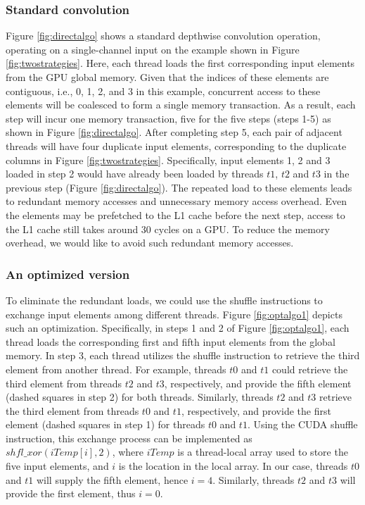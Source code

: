 \subsubsection{Standard convolution} Figure \ref{fig:directalgo} shows a standard depthwise convolution operation, operating on a single-channel input on the example shown in Figure \ref{fig:twostrategies}.
Here, each thread loads the first corresponding input elements from the GPU global memory.
Given that the indices of these elements are contiguous, i.e., 0, 1, 2, and 3 in this example, concurrent access to these elements will be coalesced to form a single memory transaction.
As a result, each step will incur one memory transaction, five for the five steps (steps 1-5) as shown in Figure \ref{fig:directalgo}.
After completing step 5, each pair of adjacent threads will have four duplicate input elements, corresponding to the duplicate columns in Figure \ref{fig:twostrategies}.
Specifically, input elements 1, 2 and 3 loaded in step 2 would have already been loaded by threads $t1$, $t2$ and $t3$ in the previous step (Figure \ref{fig:directalgo}).
The repeated load to these elements leads to redundant memory accesses and unnecessary memory access overhead.
Even the elements may be prefetched to the L1 cache before the next step, access to the L1 cache still takes around 30 cycles on a GPU.
To reduce the memory overhead, we would like to avoid such redundant memory accesses.

\subsubsection{An optimized version} To eliminate the redundant loads, we could use the shuffle instructions to exchange input elements among
different threads.
Figure \ref{fig:optalgo1} depicts such an optimization.
Specifically, in steps 1 and 2 of Figure \ref{fig:optalgo1}, each thread loads the corresponding first and fifth input elements from the global memory.
In step 3, each thread utilizes the shuffle instruction to retrieve the third element from another thread.
For example, threads $t0$ and $t1$ could retrieve the third element from threads $t2$ and $t3$, respectively, and provide the fifth element (dashed squares in step 2) for both threads.
Similarly, threads $t2$ and $t3$ retrieve the third element from threads $t0$ and $t1$, respectively, and provide the first element (dashed squares in step 1) for threads $t0$ and $t1$.
Using the CUDA shuffle instruction, this exchange process can be implemented as $shfl\_xor(iTemp[i],2)$, where $iTemp$ is a thread-local array used to store the five input elements, and $i$ is the location in the local array.
In our case, threads $t0$ and $t1$ will supply the fifth element, hence $i=4$.
Similarly, threads $t2$ and $t3$ will provide the first element, thus $i=0$.

